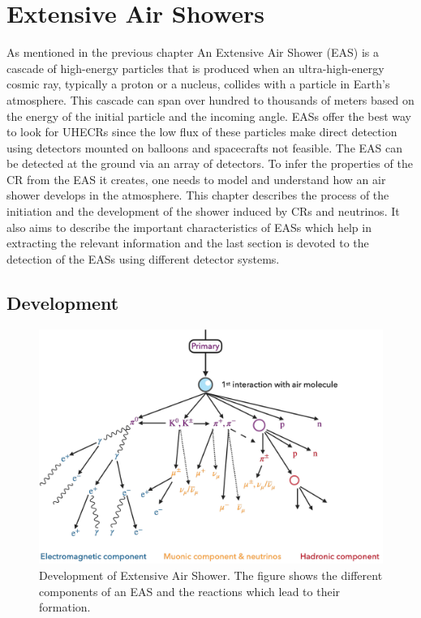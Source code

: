 
\chapter{Extensive Air Showers}
\label{chap:EAS}

As mentioned in the previous chapter An Extensive Air Shower (EAS) is a cascade of high-energy particles that is produced when an ultra-high-energy cosmic ray, typically a proton or a nucleus, collides with a particle in Earth's atmosphere. This cascade can span over hundred to thousands of meters based on the energy of the initial particle and the incoming angle. EASs offer the best way to look for UHECRs since the low flux of these particles make direct detection using detectors mounted on balloons and spacecrafts not feasible. The EAS can be detected at the ground via an array of detectors. To infer the properties of the CR from the EAS it creates, one needs to model and understand how an air shower develops in the atmosphere. This chapter describes the process of the initiation and the development of the shower induced by CRs and neutrinos. It also aims to describe the important characteristics of EASs which help in extracting the relevant information and the last section is devoted to the detection of the EASs using different detector systems. 

\section{Development}
\label{sec:EAS_dev}

\begin{figure}[t!]
    \centering
    \includegraphics[width=14.5cm]{thesis_figures/EAS/EAS_reactions.pdf}
    \caption{Development of Extensive Air Shower. The figure shows the different components of an EAS and the reactions which lead to their formation.}
    \label{fig:EAS_components}
\end{figure}

